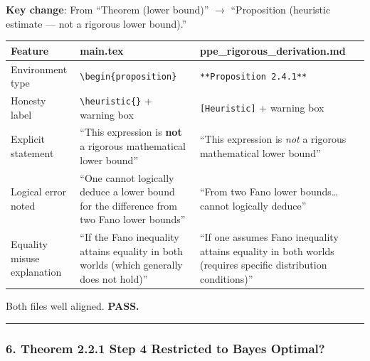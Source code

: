 \documentclass[
  12pt,
]{article}
\begin{document}
\textbf{Key change}: From ``Theorem (lower bound)'' $\to$ ``Proposition (heuristic estimate --- not a rigorous lower bound).''

\begin{longtable}[]{@{}
  >{\raggedright\arraybackslash}p{}
  >{\raggedright\arraybackslash}p{}
  >{\raggedright\arraybackslash}p{}@{}}
\toprule\noalign{}
\begin{minipage}[b]{\linewidth}\raggedright
Feature
\end{minipage} & \begin{minipage}[b]{\linewidth}\raggedright
main.tex
\end{minipage} & \begin{minipage}[b]{\linewidth}\raggedright
ppe\_rigorous\_derivation.md
\end{minipage} \\
\midrule\noalign{}
\endhead
\bottomrule\noalign{}
\endlastfoot
Environment type & \texttt{{\textbackslash}begin\{proposition\}} & \texttt{**Proposition 2.4.1**} \\
Honesty label & \texttt{{\textbackslash}heuristic\{\}} + warning box & \texttt{[Heuristic]} + warning box \\
Explicit statement & ``This expression is \textbf{not} a rigorous mathematical lower bound'' & ``This expression is \emph{not} a rigorous mathematical lower bound'' \\
Logical error noted & ``One cannot logically deduce a lower bound for the difference from two Fano lower bounds'' & ``From two Fano lower bounds\ldots cannot logically deduce'' \\
Equality misuse explanation & ``If the Fano inequality attains equality in both worlds (which generally does not hold)'' & ``If one assumes Fano inequality attains equality in both worlds (requires specific distribution conditions)'' \\
\end{longtable}

Both files well aligned. \textbf{PASS.}

\begin{center}\rule{0.5\linewidth}{0.5pt}\end{center}

\subsubsection{6. Theorem 2.2.1 Step 4 Restricted to Bayes Optimal?}\label{thm-2.2.1-step4-restricted}
\end{document}
